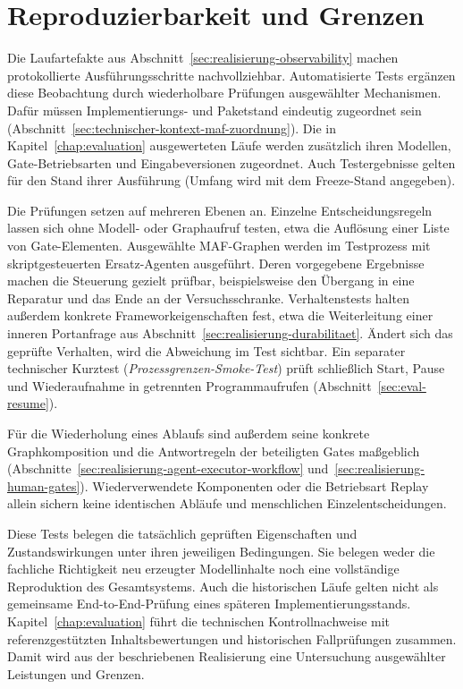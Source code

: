 
\section{Reproduzierbarkeit und Grenzen}
\label{sec:realisierung-reproduzierbarkeit-grenzen}

Die Laufartefakte aus Abschnitt~\ref{sec:realisierung-observability}
machen protokollierte Ausführungsschritte nachvollziehbar.
Automatisierte Tests ergänzen diese Beobachtung durch wiederholbare
Prüfungen ausgewählter Mechanismen. Dafür müssen Implementierungs-
und Paketstand eindeutig zugeordnet sein
(Abschnitt~\ref{sec:technischer-kontext-maf-zuordnung}). Die in
Kapitel~\ref{chap:evaluation} ausgewerteten Läufe werden zusätzlich
ihren Modellen, Gate-Betriebsarten und Eingabeversionen zugeordnet.
Auch Testergebnisse gelten für den Stand ihrer Ausführung
(Umfang wird mit dem Freeze-Stand angegeben).

Die Prüfungen setzen auf mehreren Ebenen an. Einzelne
Entscheidungsregeln lassen sich ohne Modell- oder Graphaufruf testen,
etwa die Auflösung einer Liste von Gate-Elementen. Ausgewählte
MAF-Graphen werden im Testprozess mit skriptgesteuerten Ersatz-Agenten
ausgeführt. Deren vorgegebene Ergebnisse machen die Steuerung gezielt
prüfbar, beispielsweise den Übergang in eine Reparatur und das Ende
an der Versuchsschranke. Verhaltenstests halten außerdem konkrete
Frameworkeigenschaften fest, etwa die Weiterleitung einer inneren
Portanfrage aus Abschnitt~\ref{sec:realisierung-durabilitaet}.
Ändert sich das geprüfte Verhalten, wird die Abweichung im Test
sichtbar. Ein separater technischer Kurztest
(\emph{Prozessgrenzen-Smoke-Test}) prüft schließlich Start, Pause
und Wiederaufnahme in getrennten Programmaufrufen
(Abschnitt~\ref{sec:eval-resume}).

Für die Wiederholung eines Ablaufs sind außerdem seine konkrete
Graphkomposition und die Antwortregeln der beteiligten Gates
maßgeblich (Abschnitte~\ref{sec:realisierung-agent-executor-workflow}
und~\ref{sec:realisierung-human-gates}). Wiederverwendete Komponenten
oder die Betriebsart Replay allein sichern keine identischen Abläufe
und menschlichen Einzelentscheidungen.

Diese Tests belegen die tatsächlich geprüften Eigenschaften und
Zustandswirkungen unter ihren jeweiligen Bedingungen. Sie belegen
weder die fachliche Richtigkeit neu erzeugter Modellinhalte noch
eine vollständige Reproduktion des Gesamtsystems. Auch die
historischen Läufe gelten nicht als gemeinsame End-to-End-Prüfung
eines späteren Implementierungsstands.
Kapitel~\ref{chap:evaluation} führt die technischen Kontrollnachweise
mit referenzgestützten Inhaltsbewertungen und historischen
Fallprüfungen zusammen. Damit wird aus der beschriebenen
Realisierung eine Untersuchung ausgewählter Leistungen und Grenzen.

